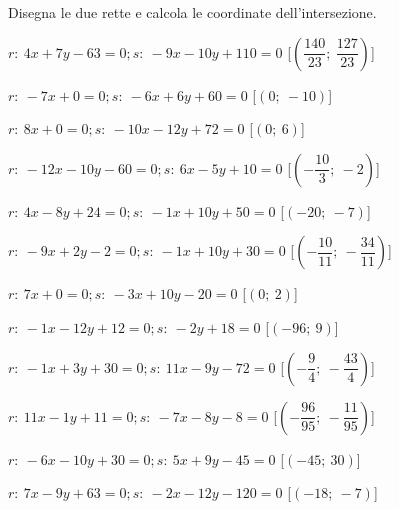 \begin{esercizio}\label{ese:}
 Disegna le due rette e calcola le coordinate dell'intersezione.
 \begin{enumeratea}
  \item  $r:~4 x + 7 y - 63 = 0; s:~-9 x - 10 y + 110 = 0$ \hfill 
   [$\left(\dfrac{140}{23};~\dfrac{127}{23}\right)$]
  \item  $r:~-7 x + 0 = 0; s:~-6 x + 6 y + 60 = 0$ \hfill 
   [$\left(0;~-10\right)$]
  \item  $r:~8 x + 0 = 0; s:~-10 x - 12 y + 72 = 0$ \hfill 
   [$\left(0;~6\right)$]
  \item  $r:~-12 x - 10 y - 60 = 0; s:~6 x - 5 y + 10 = 0$ \hfill 
   [$\left(-\dfrac{10}{3};~-2\right)$]
  \item  $r:~4 x - 8 y + 24 = 0; s:~-1 x + 10 y + 50 = 0$ \hfill 
   [$\left(-20;~-7\right)$]
  \item  $r:~-9 x + 2 y - 2 = 0; s:~-1 x + 10 y + 30 = 0$ \hfill 
   [$\left(-\dfrac{10}{11};~-\dfrac{34}{11}\right)$]
  \item  $r:~7 x + 0 = 0; s:~-3 x + 10 y - 20 = 0$ \hfill 
   [$\left(0;~2\right)$]
  \item  $r:~-1 x - 12 y + 12 = 0; s:~-2 y + 18 = 0$ \hfill 
   [$\left(-96;~9\right)$]
  \item  $r:~-1 x + 3 y + 30 = 0; s:~11 x - 9 y - 72 = 0$ \hfill 
   [$\left(-\dfrac{9}{4};~-\dfrac{43}{4}\right)$]
  \item  $r:~11 x - 1 y + 11 = 0; s:~-7 x - 8 y - 8 = 0$ \hfill 
   [$\left(-\dfrac{96}{95};~-\dfrac{11}{95}\right)$]
  \item  $r:~-6 x - 10 y + 30 = 0; s:~5 x + 9 y - 45 = 0$ \hfill 
   [$\left(-45;~30\right)$]
  \item  $r:~7 x - 9 y + 63 = 0; s:~-2 x - 12 y - 120 = 0$ \hfill 
   [$\left(-18;~-7\right)$]
 \end{enumeratea}
\end{esercizio}


